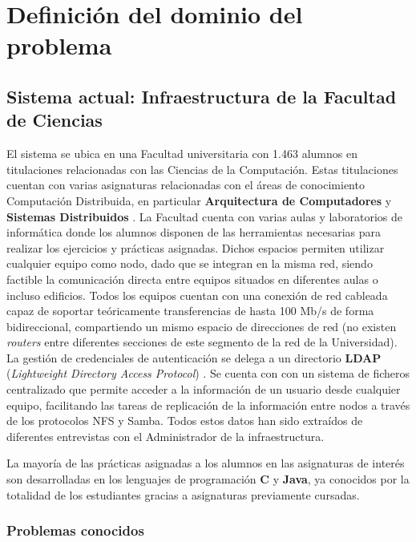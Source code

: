 \section{Definición del dominio del problema}

\subsection{Sistema actual: Infraestructura de la Facultad de Ciencias}
\label{dominioproblema:infraestructura}
El sistema se ubica en una Facultad universitaria con 1.463 alumnos \cite{uecusal:estudiantes} en titulaciones relacionadas con las Ciencias de la Computación. Estas titulaciones cuentan con varias asignaturas relacionadas con el áreas de conocimiento Computación Distribuida, en particular \textbf{Arquitectura de Computadores} y \textbf{Sistemas Distribuidos} \cite{DIA15GuiaAcademica}. La Facultad cuenta con varias aulas y laboratorios de informática donde los alumnos disponen de las herramientas necesarias para realizar los ejercicios y prácticas asignadas. Dichos espacios permiten utilizar cualquier equipo como nodo, dado que se integran en la misma red, siendo factible la comunicación directa entre equipos situados en diferentes aulas o incluso edificios. Todos los equipos cuentan con una conexión de red cableada capaz de soportar teóricamente transferencias de hasta 100 Mb/s de forma bidireccional, compartiendo un mismo espacio de direcciones de red (no existen \textit{routers} entre diferentes secciones de este segmento de la red de la Universidad). La gestión de credenciales de autenticación se delega a un directorio \textbf{LDAP} (\textit{Lightweight Directory Access Protocol}) \cite{RFC4516-comment}.
Se cuenta con con un sistema de ficheros centralizado que permite acceder a la información de un usuario desde cualquier equipo, facilitando las tareas de replicación de la información entre nodos a través de los protocolos NFS y Samba. Todos estos datos han sido extraídos de diferentes entrevistas con el Administrador de la infraestructura.

La mayoría de las prácticas asignadas a los alumnos en las asignaturas de interés son desarrolladas en los lenguajes de programación \textbf{C} y \textbf{Java}, ya conocidos por la totalidad de los estudiantes gracias a asignaturas previamente cursadas.

\subsubsection{Problemas conocidos}

